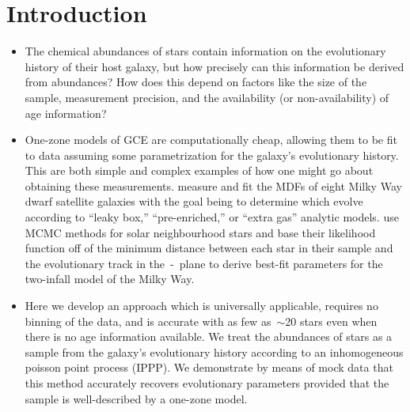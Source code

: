 \documentclass[ms.tex]{subfiles}
\begin{document}
\section{Introduction}
\label{sec:intro}

\begin{itemize}

	\item The chemical abundances of stars contain information on the
	evolutionary history of their host galaxy, but how precisely can this
	information be derived from abundances?
	How does this depend on factors like the size of the sample, measurement
	precision, and the availability (or non-availability) of age information?

	\item One-zone models of GCE are computationally cheap, allowing them to be
	fit to data assuming some parametrization for the galaxy's evolutionary
	history.
	This are both simple and complex examples of how one might go about
	obtaining these measurements.
	\citet{Kirby2011} measure and fit the MDFs of eight Milky Way dwarf
	satellite galaxies with the goal being to determine which evolve according
	to ``leaky box,'' ``pre-enriched,'' or ``extra gas'' analytic models.
	\citet{Spitoni2020} use MCMC methods for solar neighbourhood stars and
	base their likelihood function off of the minimum distance between each
	star in their sample and the evolutionary track in the~\afe-\feh~plane to
	derive best-fit parameters for the two-infall model of the Milky Way.

	\item Here we develop an approach which is universally applicable, requires
	no binning of the data, and is accurate with as few as~$\sim$20 stars even
	when there is no age information available.
	We treat the abundances of stars as a sample from the galaxy's evolutionary
	history according to an inhomogeneous poisson point process (IPPP).
	We demonstrate by means of mock data that this method accurately recovers
	evolutionary parameters provided that the sample is well-described by a
	one-zone model.

\end{itemize}
\end{document}
